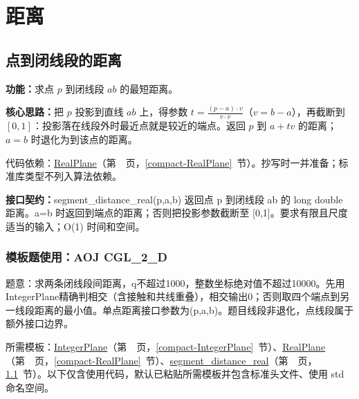 \chapter{距离}

\section{点到闭线段的距离}\label{compact-segment_distance_real}

\noindent\textbf{功能：}\allowbreak 求点 $p$ 到闭线段 $ab$ 的最短距离。

\textbf{核心思路：}\allowbreak 把 $p$ 投影到直线 $ab$ 上，得参数 $t=\frac{(p-a)\cdot v}{v\cdot v}$（$v=b-a$），再截断到 $[0,1]$：投影落在线段外时最近点就是较近的端点。返回 $p$ 到 $a+tv$ 的距离；$a=b$ 时退化为到该点的距离。

代码依赖：\hyperref[compact-RealPlane]{RealPlane}（第~\pageref{compact-RealPlane}~页，\ref{compact-RealPlane}~节）。抄写时一并准备；标准库类型不列入算法依赖。

{\sloppy{}\noindent\textbf{接口契约：}segment\_distance\_real(p,a,b) 返回点 p 到闭线段 ab 的 long double 距离。a=b 时返回到端点的距离；否则把投影参数截断至 [0,1]。要求有限且尺度适当的输入；O(1) 时间和空间。\par}



\Needspace{457pt}

\subsection*{模板题使用：AOJ CGL\_2\_D}

\label{usage-example-182}

题意：求两条闭线段间距离，q不超过1000，整数坐标绝对值不超过10000。先用IntegerPlane精确判相交（含接触和共线重叠），相交输出0；否则取四个端点到另一线段距离的最小值。单点距离接口参数为(p,a,b)。题目线段非退化，点线段属于额外接口边界。

所需模板：\hyperref[compact-IntegerPlane]{IntegerPlane}（第~\pageref{compact-IntegerPlane}~页，\ref{compact-IntegerPlane}~节）、\hyperref[compact-RealPlane]{RealPlane}（第~\pageref{compact-RealPlane}~页，\ref{compact-RealPlane}~节）、\hyperref[compact-segment_distance_real]{segment\_\allowbreak{}distance\_\allowbreak{}real}（第~\pageref{compact-segment_distance_real}~页，\ref{compact-segment_distance_real}~节）。以下仅含使用代码，默认已粘贴所需模板并包含标准头文件、使用 std 命名空间。

